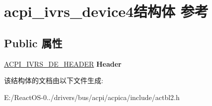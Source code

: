 \hypertarget{structacpi__ivrs__device4}{}\section{acpi\+\_\+ivrs\+\_\+device4结构体 参考}
\label{structacpi__ivrs__device4}
\subsection*{Public 属性}
\begin{DoxyCompactItemize}
\item 
\mbox{\label{structacpi__ivrs__device4_a08b712223dd84864a63e2d607a85517c}} 
\hyperlink{structacpi__ivrs__de__header}{A\+C\+P\+I\+\_\+\+I\+V\+R\+S\+\_\+\+D\+E\+\_\+\+H\+E\+A\+D\+ER} {\bfseries Header}
\end{DoxyCompactItemize}


该结构体的文档由以下文件生成\+:\begin{DoxyCompactItemize}
\item 
E\+:/\+React\+O\+S-\/0../drivers/bus/acpi/acpica/include/actbl2.\+h\end{DoxyCompactItemize}
